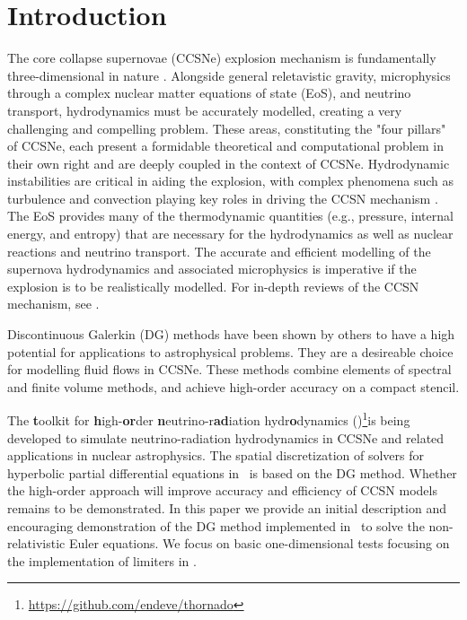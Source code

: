 \documentclass[onecolumn]{aastex62}
\begin{document}
\section{Introduction}
\label{sec:Intro}
The core collapse supernovae (CCSNe) explosion mechanism is fundamentally three-dimensional
in nature \citep[see e.g.,][]{blondin:2006, muller:2012, oconnor:2018b}. Alongside general
reletavistic gravity, microphysics through a complex nuclear matter equations of state (EoS), and
neutrino transport, hydrodynamics must be accurately modelled,
creating a very challenging and compelling problem. These areas, constituting the 
"four pillars" of CCSNe, each present a formidable theoretical and computational 
problem in their own right and are deeply coupled in the context of CCSNe.
Hydrodynamic instabilities are critical
in aiding the explosion, with complex phenomena such as turbulence and
convection playing key roles in driving the CCSN mechanism
\citep{murphy:2011, murphy:2013, couch:2013, couch:2015a, radice:2016, couch:2020}. The 
EoS provides many of the thermodynamic quantities (e.g., 
pressure, internal energy, and entropy) that are necessary for the hydrodynamics 
as well as nuclear reactions and neutrino transport.
The accurate and efficient modelling of the supernova hydrodynamics and associated microphysics is imperative if the
explosion is to be realistically modelled.
For in-depth reviews of the CCSN mechanism, see
\citet{bethe:1990, janka:2007, janka:2012a, janka:2016, burrows:2013, hix:2014, muller:2016, couch:2017}.

Discontinuous Galerkin (DG) methods have been shown by others
\citep[see e.g.,][]{radice:2011, schaal:2015a, zanotti:2015, dumbser:2018} to have a
high potential for applications to astrophysical problems. They are a desireable
choice for modelling fluid flows in CCSNe. These methods combine elements of
spectral and finite volume methods, and achieve high-order accuracy
on a compact stencil.

The {\bf t}oolkit for {\bf h}igh-{\bf or}der {\bf n}eutrino-r{\bf ad}iation hydr{\bf o}dynamics
(\thornado)\citep{endeve:2019}\footnote{\url{https://github.com/endeve/thornado}}is being developed to simulate neutrino-radiation
hydrodynamics in CCSNe and related applications in nuclear astrophysics.
The spatial discretization of solvers for hyperbolic partial differential equations in \thornado\, is based on the DG method.
Whether the high-order approach will improve accuracy and efficiency of CCSN models remains to be demonstrated.
In this paper we provide an initial description and encouraging demonstration
of the DG method implemented in \thornado\, to solve the non-relativistic Euler equations.
We focus on basic one-dimensional tests focusing on the implementation of limiters in \thornado.
\end{document}
